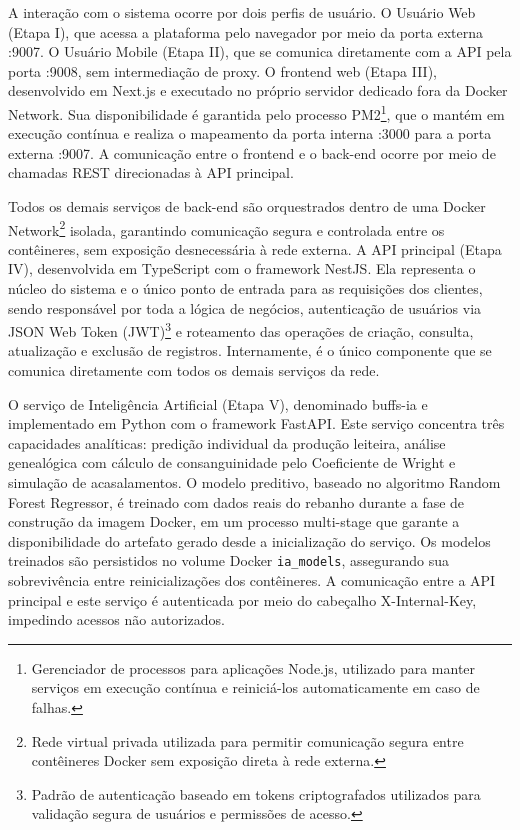 \documentclass[11pt,a4paper]{article}
\begin{document}
A interação com o sistema ocorre por dois perfis de usuário. O Usuário Web (Etapa I), que acessa a plataforma pelo navegador por meio da porta externa :9007. O Usuário Mobile (Etapa II), que se comunica diretamente com a API pela porta :9008, sem intermediação de proxy. O frontend web (Etapa III), desenvolvido em Next.js e executado no próprio servidor dedicado fora da Docker Network. Sua disponibilidade é garantida pelo processo PM2\footnote{Gerenciador de processos para aplicações Node.js, utilizado para manter serviços em execução contínua e reiniciá-los automaticamente em caso de falhas.}, que o mantém em execução contínua e realiza o mapeamento da porta interna :3000 para a porta externa :9007. A comunicação entre o frontend e o back-end ocorre por meio de chamadas REST direcionadas à API principal.

Todos os demais serviços de back-end são orquestrados dentro de uma Docker Network\footnote{Rede virtual privada utilizada para permitir comunicação segura entre contêineres Docker sem exposição direta à rede externa.} isolada, garantindo comunicação segura e controlada entre os contêineres, sem exposição desnecessária à rede externa. A API principal (Etapa IV), desenvolvida em TypeScript com o framework NestJS. Ela representa o núcleo do sistema e o único ponto de entrada para as requisições dos clientes, sendo responsável por toda a lógica de negócios, autenticação de usuários via JSON Web Token (JWT)\footnote{Padrão de autenticação baseado em tokens criptografados utilizados para validação segura de usuários e permissões de acesso.} e roteamento das operações de criação, consulta, atualização e exclusão de registros. Internamente, é o único componente que se comunica diretamente com todos os demais serviços da rede.

O serviço de Inteligência Artificial (Etapa V), denominado buffs-ia e implementado em Python com o framework FastAPI. Este serviço concentra três capacidades analíticas: predição individual da produção leiteira, análise genealógica com cálculo de consanguinidade pelo Coeficiente de Wright e simulação de acasalamentos. O modelo preditivo, baseado no algoritmo Random Forest Regressor, é treinado com dados reais do rebanho durante a fase de construção da imagem Docker, em um processo multi-stage que garante a disponibilidade do artefato gerado desde a inicialização do serviço. Os modelos treinados são persistidos no volume Docker \texttt{ia\_models}, assegurando sua sobrevivência entre reinicializações dos contêineres. A comunicação entre a API principal e este serviço é autenticada por meio do cabeçalho X-Internal-Key, impedindo acessos não autorizados.
\end{document}
